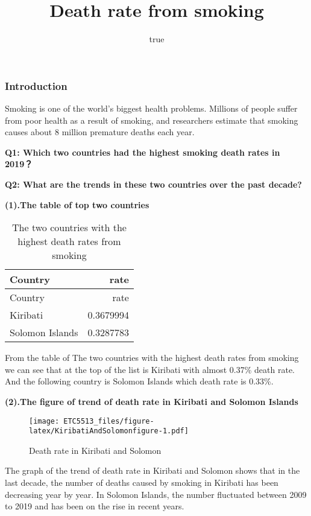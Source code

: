 \documentclass[
]{article}
\title{Death rate from smoking}
\author{true}
\date{}
\begin{document}
\maketitle

\hypertarget{introduction}{%
\subsubsection{Introduction}\label{introduction}}

Smoking is one of the world's biggest health problems. Millions of
people suffer from poor health as a result of smoking, and researchers
estimate that smoking causes about 8 million premature deaths each year.

\textbf{Q1: Which two countries had the highest smoking death rates in
2019？}

\textbf{Q2: What are the trends in these two countries over the past
decade?}

\textbf{(1).The table of top two countries}

\begin{longtable}[]{@{}lr@{}}
\caption{The two countries with the highest death rates from
smoking}\tabularnewline
\toprule()
Country & rate \\
\midrule()
\endfirsthead
\toprule()
Country & rate \\
\midrule()
\endhead
Kiribati & 0.3679994 \\
Solomon Islands & 0.3287783 \\
\bottomrule()
\end{longtable}

From the table of The two countries with the highest death rates from
smoking we can see that at the top of the list is Kiribati with almost
0.37\% death rate. And the following country is Solomon Islands which
death rate is 0.33\%.

\textbf{(2).The figure of trend of death rate in Kiribati and Solomon
Islands}

\begin{figure}
\centering
\texttt{[image: ETC5513\_files/figure-latex/KiribatiAndSolomonfigure-1.pdf]}
\caption{Death rate in Kiribati and Solomon}
\end{figure}

The graph of the trend of death rate in Kiribati and Solomon shows that
in the last decade, the number of deaths caused by smoking in Kiribati
has been decreasing year by year. In Solomon Islands, the number
fluctuated between 2009 to 2019 and has been on the rise in recent
years.
\end{document}
